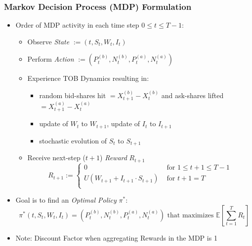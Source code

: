 \documentclass[handout]{beamer}
\begin{document}
\begin{frame}
\frametitle{Markov Decision Process (MDP) Formulation}
\pause
\begin{itemize}[<+->]
\item Order of MDP activity in each time step $0 \leq t \leq T-1$:
\begin{itemize}
\item Observe {\em State} $:= (t, S_t, W_t, I_t)$
\item Perform {\em Action} $:= (P_t^{(b)}, N_t^{(b)}, P_t^{(a)}, N_t^{(a)})$
\item Experience TOB Dynamics resulting in:
\begin{itemize}
\item random bid-shares hit $=X_{t+1}^{(b)} - X_t^{(b)}$ and ask-shares lifted $=X_{t+1}^{(a)} - X_t^{(a)}$
\item update of $W_t$ to $W_{t+1}$, update of $I_t$ to $I_{t+1}$
\item stochastic evolution of $S_t$ to $S_{t+1}$
\end{itemize}
\item Receive next-step ($t+1$) {\em Reward} $R_{t+1}$
$$
R_{t+1} :=
\begin{cases}
0 & \text{ for }1 \leq t+1 \leq T-1 \\
U(W_{t+1} + I_{t+1} \cdot S_{t+1}) & \text{ for } t+1 = T \\
\end{cases}
$$
\end{itemize}
\item Goal is to find an {\em Optimal Policy} $\pi^*$:
$$\pi^*(t, S_t, W_t, I_t) = (P_t^{(b)}, N_t^{(b)}, P_t^{(a)}, N_t^{(a)}) \mbox{ that maximizes } \mathbb{E}[\sum_{t=1}^T R_t]$$
\item Note: Discount Factor when aggregating Rewards in the MDP is 1
\end{itemize}
\end{frame}
\end{document}
